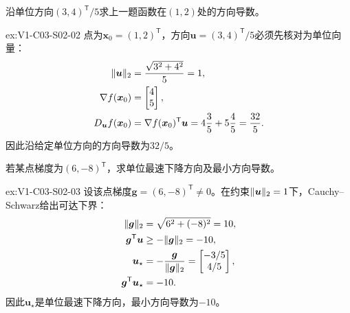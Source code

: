 \begin{SLChapterExercisePairSection}
\begin{exercise}[方向导数]\label{ex:V1-C03-S02-02}
沿单位方向$(3,4)^{\mathsf T}/5$求上一题函数在$(1,2)$处的方向导数。
\end{exercise}
\label{sol:V1-C03-S02-02}
\begin{chapterexercisesolution}{ex:V1-C03-S02-02}
点为$\boldsymbol x_0=(1,2)^{\mathsf T}$，方向$\boldsymbol u=(3,4)^{\mathsf T}/5$必须先核对为单位向量：
\[
\begin{aligned}
\lVert\boldsymbol u\rVert_2
&=\frac{\sqrt{3^2+4^2}}5=1,\\
\nabla f(\boldsymbol x_0)&=\begin{bmatrix}4\\5\end{bmatrix},\\
D_{\boldsymbol u}f(\boldsymbol x_0)
&=\nabla f(\boldsymbol x_0)^{\mathsf T}\boldsymbol u
=4\frac35+5\frac45=\frac{32}{5}.
\end{aligned}
\]
因此沿给定单位方向的方向导数为$32/5$。
\end{chapterexercisesolution}

\begin{exercise}[最速下降方向]\label{ex:V1-C03-S02-03}
若某点梯度为$(6,-8)^{\mathsf T}$，求单位最速下降方向及最小方向导数。
\end{exercise}
\label{sol:V1-C03-S02-03}
\begin{chapterexercisesolution}{ex:V1-C03-S02-03}
设该点梯度$\boldsymbol g=(6,-8)^{\mathsf T}\ne0$。在约束$\lVert\boldsymbol u\rVert_2=1$下，Cauchy--Schwarz给出可达下界：
\[
\begin{aligned}
\lVert\boldsymbol g\rVert_2&=\sqrt{6^2+(-8)^2}=10,\\
\boldsymbol g^{\mathsf T}\boldsymbol u&\ge-\lVert\boldsymbol g\rVert_2=-10,\\
\boldsymbol u_\star&=-\frac{\boldsymbol g}{\lVert\boldsymbol g\rVert_2}
=\begin{bmatrix}-3/5\\4/5\end{bmatrix},\\
\boldsymbol g^{\mathsf T}\boldsymbol u_\star&=-10.
\end{aligned}
\]
因此$\boldsymbol u_\star$是单位最速下降方向，最小方向导数为$-10$。
\end{chapterexercisesolution}


\end{SLChapterExercisePairSection}
